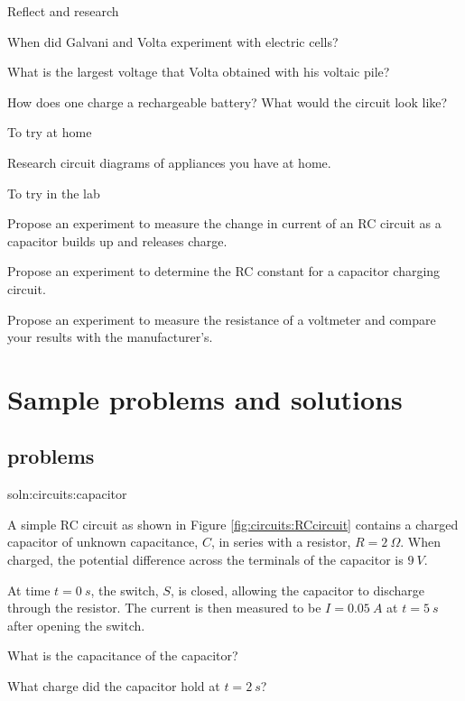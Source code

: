 \begin{chapteractivity}{Reflect and research}
{
\item When did Galvani and Volta experiment with electric cells?
\item What is the largest voltage that Volta obtained with his voltaic pile?
\item How does one charge a rechargeable battery? What would the circuit look like?
}
\end{chapteractivity}

\begin{chapteractivity}{To try at home}
{
\item Research circuit diagrams of appliances you have at home.
}
\end{chapteractivity}

\begin{chapteractivity}{To try in the lab}
{
\item Propose an experiment to measure the change in current of an RC circuit as a capacitor builds up and releases charge.
\item Propose an experiment to determine the RC constant for a capacitor charging circuit.
\item Propose an experiment to measure the resistance of a voltmeter and compare your results with the manufacturer's.
}
\end{chapteractivity}

\newpage
\section{Sample problems and solutions}

\subsection{problems}
\begin{problemParts}{soln:circuits:capacitor}{\label{prob:circuits:capacitor} 
A simple RC circuit as shown in Figure \ref{fig:circuits:RCcircuit} contains a charged capacitor of unknown capacitance, $C$, in series with a resistor, $R=\SI{2}{\Omega}$. When charged, the potential difference across the terminals of the capacitor is $\SI{9}{V}$. 

At time $t=\SI{0}{s}$, the switch, $S$, is closed, allowing the capacitor to discharge through the resistor. The current is then measured to be $I = \SI{0.05}{A}$ at $t = \SI{5}{s}$ after opening the switch.}
{
\item What is the capacitance of the capacitor?
\item What charge did the capacitor hold at $t = \SI{2}{s}$?
}
\end{problemParts}

